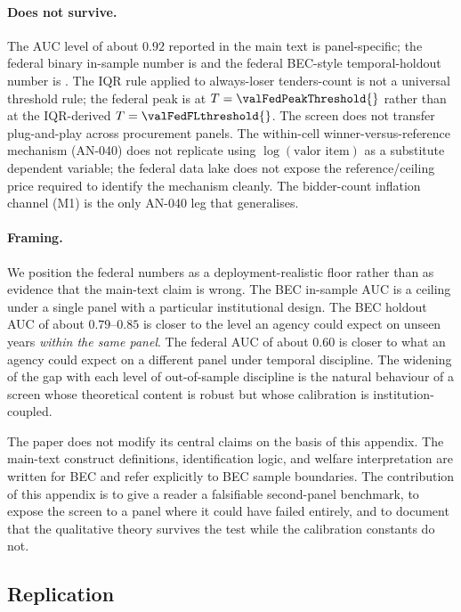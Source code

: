 \paragraph{Does not survive.} The AUC level of about $0.92$
reported in the main text is panel-specific; the federal binary
in-sample number is \valFedAucBinary{} and the federal BEC-style
temporal-holdout number is \valFedHoldoutBecStyleBinary{}. The
IQR rule applied to always-loser tenders-count is not a universal
threshold rule; the federal peak is at $T = \valFedPeakThreshold{}$
rather than at the IQR-derived $T = \valFedFLthreshold{}$. The
screen does not transfer plug-and-play across procurement
panels. The within-cell winner-versus-reference mechanism
(AN-040) does not replicate using $\log(\text{valor item})$ as
a substitute dependent variable; the federal data lake does not
expose the reference/ceiling price required to identify the
mechanism cleanly. The bidder-count inflation channel (M1) is
the only AN-040 leg that generalises.

\paragraph{Framing.}
We position the federal numbers as a deployment-realistic floor
rather than as evidence that the main-text claim is wrong. The
BEC in-sample AUC is a ceiling under a single panel with a
particular institutional design. The BEC holdout AUC of about
$0.79$--$0.85$ is closer to the level an agency could expect on
unseen years \emph{within the same panel}. The federal AUC of
about $0.60$ is closer to what an agency could expect on a
different panel under temporal discipline. The widening of the
gap with each level of out-of-sample discipline is the natural
behaviour of a screen whose theoretical content is robust but
whose calibration is institution-coupled.

The paper does not modify its central claims on the basis of
this appendix. The main-text construct definitions, identification
logic, and welfare interpretation are written for BEC and refer
explicitly to BEC sample boundaries. The contribution of this
appendix is to give a reader a falsifiable second-panel
benchmark, to expose the screen to a panel where it could have
failed entirely, and to document that the qualitative theory
survives the test while the calibration constants do not.

\subsection{Replication}
\label{app:comprasnet_replication_artifacts}

